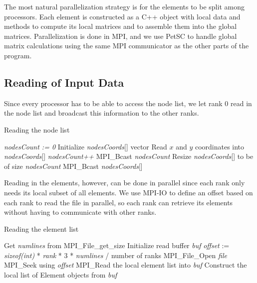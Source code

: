 \documentclass[12pt,notitlepage]{extreport}
\begin{document}
The most natural parallelization strategy is for the elements to be split among processors. Each element is constructed as a C++ object with local data and methods to compute its local matrices and to assemble them into the global matrices. Parallelization is done in MPI, and we use PetSC to handle global matrix calculations using the same MPI communicator as the other parts of the program.

\subsection*{Reading of Input Data}
 Since every processor has to be able to access the node list, we let rank 0 read in the node list and broadcast this information to the other ranks.
\begin{algorithm}[htp]
  \caption{Reading the node list}
  \begin{algorithmic}
     
    \State \textit{nodesCount := 0}
    \State Initialize \textit{nodesCoords}[] vector
    \State Read $x$ and $y$ coordinates into \textit{nodesCoords}[]
    \State \textit{nodesCount++}
    \EndFor
    \EndIf
    \State MPI\_Bcast \textit{nodesCount}
    \State Resize \textit{nodesCoords}[] to be of size \textit{nodesCount}
    \State MPI\_Bcast \textit{nodesCoords}[]
    \EndProcedure
  \end{algorithmic}
\end{algorithm}

Reading in the elements, however, can be done in parallel since each rank only needs its local subset of all elements. We use MPI-IO to define an offset based on each rank to read the file in parallel, so each rank can retrieve its elements without having to communicate with other ranks.
\begin{algorithm}[htp]
  \caption{Reading the element list}
  \begin{algorithmic}
    \State Get \textit{numlines} from MPI\_File\_get\_size
    \State Initialize read buffer \textit{buf}
    \State \textit{offset} := \textit{sizeof(int)} * \textit{rank} * 3 * \textit{numlines} / number of ranks
    \State MPI\_File\_Open \textit{file}
    \State MPI\_Seek using \textit{offset}
    \State MPI\_Read the local element list into \textit{buf}
    \State Construct the local list of Element objects from \textit{buf}
    \EndProcedure
  \end{algorithmic}
\end{algorithm}
\end{document}
